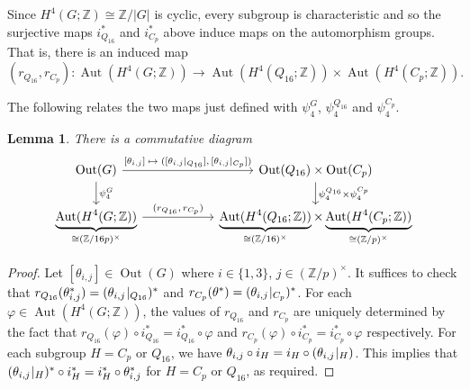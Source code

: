 \documentclass[11pt,leqno,a4paper]{amsart}
\newcommand{\Z}{\mathbb{Z}}
\DeclareMathOperator{\Aut}{Aut}
\DeclareMathOperator{\Out}{Out}
\newtheorem{lemma}[thm]{Lemma}
\theoremstyle{definition}
\theoremstyle{remark}
\theoremstyle{custom}
\begin{document}
Since $H^4(G;\Z) \cong \Z/|G|$ is cyclic, every subgroup is characteristic and so the surjective maps $i^*_{Q_{16}}$ and $i^*_{C_p}$ above induce maps on the automorphism groups. That is, there is an induced map
\[ (r_{Q_{16}},r_{C_p}) : \Aut(H^4(G;\Z)) \to \Aut(H^4(Q_{16};\Z)) \times \Aut(H^4(C_p;\Z)). \]

The following relates the two maps just defined with $\psi_4^G$, $\psi_4^{Q_{16}}$ and $\psi_4^{C_p}$.

\begin{lemma} \label{lemma:psi4-split}
There is a commutative diagram
\[
\begin{tikzcd}[column sep =20mm]
\Out(G) \ar[d,"\psi_4^G"] \ar[r,"\text{$[\theta_{i,j}] \mapsto ([\theta_{i,j}\hspace{-.75mm}\mid_{Q_{16}}],[\theta_{i,j}\hspace{-.75mm}\mid_{C_p}])$}"] & \Out(Q_{16}) \times \Out(C_p) \ar[d," \psi_4^{Q_{16}} \times \psi_4^{C_p}"] \\
\underbrace{\Aut(H^4(G;\Z))}_{\cong (\Z/16p)^\times} 
\ar[r,"\text{$(r_{Q_{16}},r_{C_p})$}"] & \underbrace{\Aut(H^4(Q_{16};\Z))}_{\cong (\Z/16)^\times} \times \underbrace{\Aut(H^4(C_p;\Z))}_{\cong (\Z/p)^\times}
\end{tikzcd}
\]
\end{lemma}

\begin{proof}
Let $[\theta_{i,j}] \in \Out(G)$ where $i \in \{1,3\}$, $j \in (\Z/p)^\times$. It suffices to check that $r_{Q_{16}}(\theta_{i,j}^*) = (\theta_{i,j}\hspace{-.75mm}\mid_{Q_{16}})^*$ and $r_{C_p}(\theta^*) = (\theta_{i,j}\hspace{-.75mm}\mid_{C_p})^*$.
For each $\varphi \in \Aut(H^4(G;\Z))$, the values of $r_{Q_{16}}$ and $r_{C_p}$ are uniquely determined by the fact that $r_{Q_{16}}(\varphi) \circ i_{Q_{16}}^* = i_{Q_{16}}^* \circ \varphi$ and $r_{C_p}(\varphi) \circ i_{C_p}^* = i_{C_p}^* \circ \varphi$ respectively.
For each subgroup $H = C_p$ or $Q_{16}$, we have $\theta_{i,j} \circ i_H = i_H \circ (\theta_{i,j}\hspace{-.75mm}\mid_{H})$. This implies that $(\theta_{i,j}\hspace{-.75mm}\mid_{H})^* \circ i_H^* = i_H^* \circ \theta_{i,j}^*$ for $H = C_p$ or $Q_{16}$, as required.
\end{proof}
\end{document}
